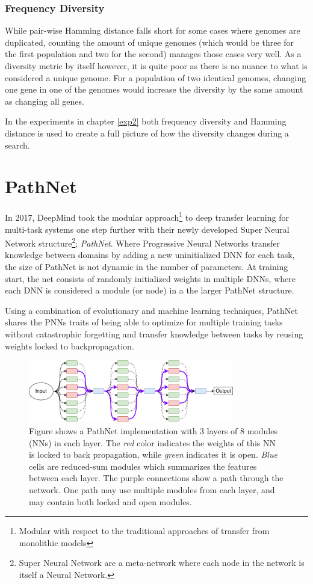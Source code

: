 \subsubsection{Frequency Diversity}
While pair-wise Hamming distance falls short for some cases where genomes are duplicated, counting the amount of unique genomes (which would be three for the first population and two for the second) manages those cases very well. As a diversity metric by itself however, it is quite poor as there is no nuance to what is considered a unique genome. For a population of two identical genomes, changing one gene in one of the genomes would increase the diversity by the same amount as changing all genes. 

In the experiments in chapter \ref{exp2} both frequency diversity and Hamming distance is used to create a full picture of how the diversity changes during a search.

\section{PathNet}
\label{background:pn}
In 2017, DeepMind took the modular approach\footnote{Modular with respect to the traditional approaches of transfer from monolithic models} to deep transfer learning for multi-task systems one step further with their newly developed Super Neural Network structure\footnote{Super Neural Network are a meta-network where each node in the network is itself a Neural Network.}; \textit{PathNet}\cite{pathnet}. Where Progressive Neural Networks transfer knowledge between domains by adding a new uninitialized DNN for each task, the size of PathNet is not dynamic in the number of parameters. At training start, the net consists of randomly initialized weights in multiple DNNs, where each DNN is considered a module (or node) in a the larger PathNet structure. 

Using a combination of evolutionary and machine learning techniques, PathNet shares the PNNs traits of being able to optimize for multiple training tasks without catastrophic forgetting and transfer knowledge between tasks by reusing weights locked to backpropagation.  
\begin{figure}[h]
    \centering
    \includegraphics[width=0.8\textwidth]{Chapters/2.Background/figures/PathNet.pdf}
    \caption[PathNet structure]{Figure shows a PathNet implementation with 3 layers of 8 modules (NNs) in each layer. The \textit{red} color indicates the weights of this NN is locked to back propagation, while \textit{green} indicates it is open. \textit{Blue} cells are reduced-sum modules which summarizes the features between each layer. The purple connections show a path through the network. One path may use multiple modules from each layer, and may contain both locked and open modules.}
    \label{fig:pathnet}
\end{figure}

